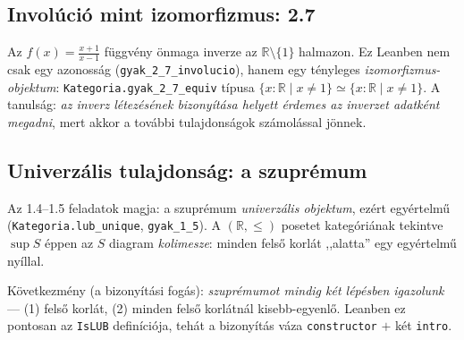 \documentclass[11pt,a4paper]{article}
\newcommand{\lean}[1]{\texttt{\small #1}}
\newcommand{\R}{\mathbb{R}}
\theoremstyle{definition}
\begin{document}
\subsection{Involúció mint izomorfizmus: 2.7}

Az $f(x) = \frac{x+1}{x-1}$ függvény önmaga inverze az $\R\setminus\{1\}$ halmazon.
Ez Leanben nem csak egy azonosság (\lean{gyak\_2\_7\_involucio}), hanem egy
tényleges \emph{izomorfizmus-objektum}: \lean{Kategoria.gyak\_2\_7\_equiv} típusa
$\{x : \R \mid x \ne 1\} \simeq \{x : \R \mid x \ne 1\}$.
A tanulság: \emph{az inverz létezésének bizonyítása helyett érdemes az inverzet
adatként megadni}, mert akkor a további tulajdonságok számolással jönnek.

\begin{center}
\end{center}

\subsection{Univerzális tulajdonság: a szuprémum}

Az 1.4--1.5 feladatok magja: a szuprémum \emph{univerzális objektum}, ezért
egyértelmű (\lean{Kategoria.lub\_unique}, \lean{gyak\_1\_5}). A $(\R,\le)$ posetet
kategóriának tekintve $\sup S$ éppen az $S$ diagram \emph{kolimesze}: minden felső
korlát ,,alatta'' egy egyértelmű nyíllal.

\begin{center}
\end{center}
\noindent
Következmény (a bizonyítási fogás): \emph{szuprémumot mindig két lépésben
igazolunk} --- (1) felső korlát, (2) minden felső korlátnál kisebb-egyenlő.
Leanben ez pontosan az \lean{IsLUB} definíciója, tehát a bizonyítás váza
\lean{constructor} $+$ két \lean{intro}.
\end{document}
